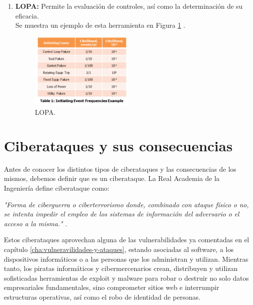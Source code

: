 \begin{enumerate}
\item {\bfseries LOPA:}
Permite la evaluación de controles, así como la determinación de su eficacia.\\
Se muestra un ejemplo de esta herramienta en Figura \ref{img:lopa} \cite{lopa}.
\begin{figure}[tphb]
  		   \centering
     		   \includegraphics[width=2in]{LOPA.png}
  		   \caption{LOPA.}
  		   \label{img:lopa}
\end{figure}

\end{enumerate}




\chapter{Ciberataques y sus consecuencias}
\label{cha:ciberataques-y-consecuencias}

Antes de conocer los distintos tipos de ciberataques y las consecuencias de los mismos, debemos definir que es un ciberataque. La Real Academia 
de la Ingeniería define ciberataque como:

\emph{"Forma de ciberguerra o ciberterrorismo donde, combinado con ataque físico o no, se intenta impedir el empleo de los sistemas de información 
del adversario o el acceso a la misma." \cite{ciberataque-rai}}.

Estos ciberataques aprovechan alguna de las vulnerabilidades ya comentadas en el capítulo \ref{cha:vulneravilidades-y-ataques}, estando asociadas al software, a los dispositivos 
informáticos o a las personas que los administran y utilizan. Mientras tanto, los piratas informáticos y cibermercenarios crean, distribuyen y utilizan 
sofisticadas herramientas de exploit y malware para robar o destruir no solo datos empresariales fundamentales, sino comprometer sitios web e 
interrumpir estructuras operativas, así como el robo de identidad de personas.

